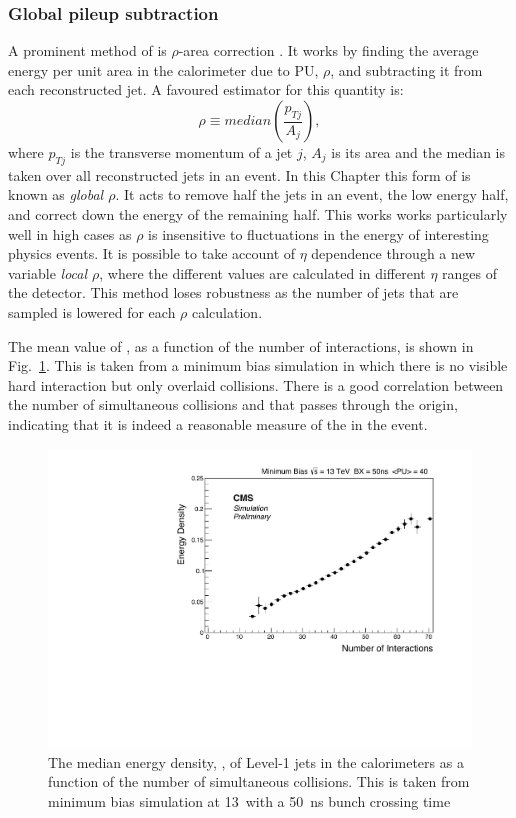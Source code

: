 \subsubsection{Global pileup subtraction}

A prominent method of \PUS is $\rho$-area correction
\cite{Cacciari:2007fd,Cacciari:2008gn}. It works by finding the
average energy per unit area in the calorimeter due to PU, $\rho$, and
subtracting it from each reconstructed jet. A favoured estimator for this
quantity is:
\begin{equation}
\rho\equiv median(\frac{p_{Tj}}{A_j}),
\end{equation}
where $p_{Tj}$ is the transverse momentum of a jet $j$, $A_j$ is its
area and the median is taken over all reconstructed jets in an event.
In this Chapter this form of \PUS is known as \emph{global $\rho$}. It
acts to remove half the jets in an event, the low energy half, and
correct down the energy of the remaining half. This works works
particularly well in high \PU cases as $\rho$ is insensitive to
fluctuations in the energy of interesting physics events. It is
possible to take account of $\eta$ dependence through a new variable
\emph{local $\rho$}, where the different values are calculated in
different $\eta$ ranges of the detector. This method loses robustness
as the number of jets that are sampled is lowered for each $\rho$
calculation.

The mean value of \rho, as a function of the number of interactions, is
shown in Fig.~\ref{fig:rho}. This is taken from a minimum bias \MC
simulation in which there is no visible hard interaction but only
overlaid \PU collisions. There is a good correlation between the
number of simultaneous collisions and \rho that passes through the
origin, indicating that it is indeed a reasonable measure of the \PU
in the event. 

\begin{figure}
	\begin{center}
		\includegraphics[width=1.0\linewidth]{figs/trigger/median}
	\end{center}
  \caption{The median energy density, \rho, of Level-1 jets in the \CMS
  calorimeters as a function of the number of simultaneous collisions.
  This is taken from minimum bias \MC simulation at 13~\tev with a
  50~ns bunch crossing time}
	\label{fig:rho}
\end{figure}

